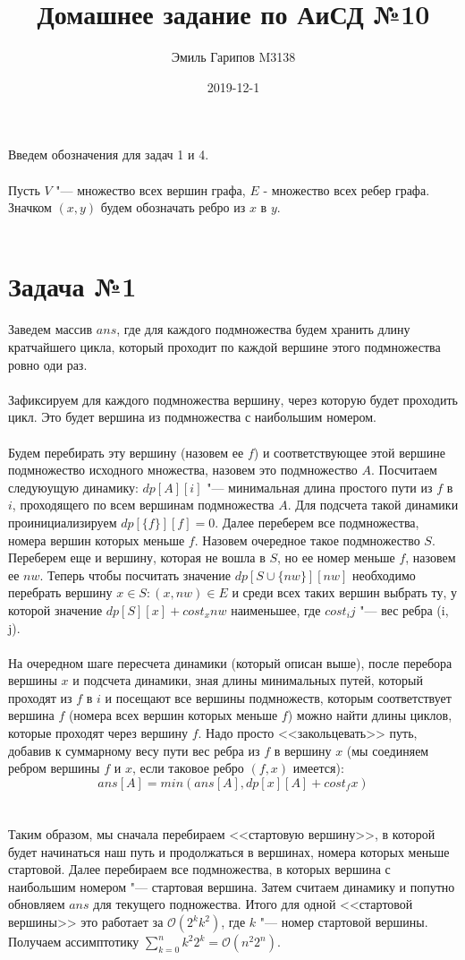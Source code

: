 \documentclass{article}
\title{Домашнее задание по АиСД №10}
\date{2019-12-1}
\author{Эмиль Гарипов M3138}
\begin{document}

\maketitle
\newpage
{}
Введем обозначения для задач 1 и 4.\\\\
Пусть $V$ "--- множество всех вершин графа, $E$ - множество всех ребер графа. Значком $(x, y)$ будем обозначать ребро из $x$ в $y$. \\\\

\section*{Задача №1}
Заведем массив $ans$, где для каждого подмножества будем хранить длину кратчайшего цикла, который проходит по каждой вершине этого подмножества ровно оди раз. \\\\
Зафиксируем для каждого подмножества вершину, через которую будет проходить цикл. Это будет вершина из подмножества с наибольшим номером. 
\\\\
Будем перебирать эту вершину (назовем ее $f$) и соответствующее этой вершине подмножество исходного множества, назовем это подмножество $A$. Посчитаем следуюущую динамику: $dp[A][i]$ "--- минимальная длина простого пути из $f$ в $i$, проходящего по всем вершинам подмножества $A$. Для подсчета такой динамики проинициализируем $dp[\{f\}][f] = 0$. Далее переберем все подмножества, номера вершин которых меньше $f$. Назовем очередное такое подмножество $S$. Переберем еще и вершину, которая не вошла в $S$, но ее номер меньше $f$, назовем ее $nw$. Теперь чтобы посчитать значение $dp[S \cup \{nw\}][nw]$ необходимо перебрать вершину $x \in S: (x, nw) \in E$ и среди всех таких вершин выбрать ту, у которой значение $dp[S][x] + cost_{x}{nw}$ наименьшее, где $cost_{i}{j}$ "--- вес ребра (i, j).\\\\
На очередном шаге пересчета динамики (который описан выше), после перебора вершины $x$ и подсчета динамики, зная длины минимальных путей, который проходят из $f$ в $i$ и посещают все вершины подмножеств, которым соответствует вершина $f$ (номера всех вершин которых меньше  $f$) можно найти длины циклов, которые проходят через вершину $f$. Надо просто <<закольцевать>> путь, добавив к суммарному весу пути вес ребра из $f$ в вершину $x$ (мы соединяем ребром вершины $f$ и $x$, если таковое ребро $(f,x)$ имеется): $$ans[A] = min(ans[A], dp[x][A] + cost_{f}{x})$$\\\\
Таким образом, мы сначала перебираем <<стартовую вершину>>, в которой будет начинаться наш путь и продолжаться в вершинах, номера которых меньше стартовой. Далее перебираем все подмножества, в которых вершина с наибольшим номером "--- стартовая вершина. Затем считаем динамику и попутно обновляем $ans$ для текущего подножества. Итого для одной <<стартовой вершины>> это работает за $\mathcal{O}(2^{k}k^2)$, где $k$ "--- номер стартовой вершины. Получаем ассимптотику $\sum_{k = 0}^{n}k^{2}2^{k} = \mathcal{O}(n^{2}2^{n})$.
\\
\end{document}
